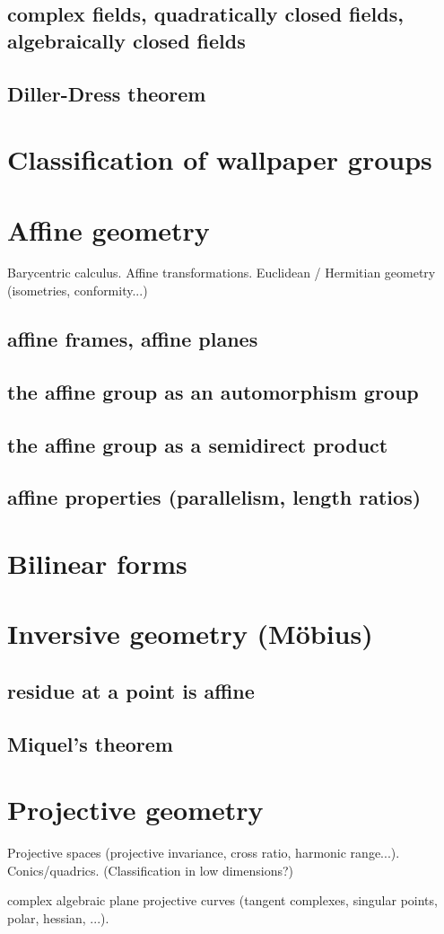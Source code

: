 \documentclass[a4,12pt]{amsbook}
\begin{document}
\section{complex fields, quadratically closed fields, algebraically closed fields}
\section{Diller-Dress theorem}
\chapter{Classification of wallpaper groups}
\chapter{Affine geometry}
Barycentric calculus. Affine transformations. Euclidean / Hermitian geometry (isometries, conformity...)
\section{affine frames, affine planes}
\section{the affine group as an automorphism group}
\section{the affine group as a semidirect product}
\section{affine properties (parallelism, length ratios)}
\chapter{Bilinear forms}
\chapter{Inversive geometry (Möbius)}
\section{residue at a point is affine}
\section{Miquel's theorem}
\chapter{Projective geometry}
Projective spaces (projective invariance, cross ratio, harmonic range...). Conics/quadrics. (Classification in low dimensions?)
\par
complex algebraic plane projective curves (tangent complexes, singular points, polar, hessian, ...).
\end{document}
